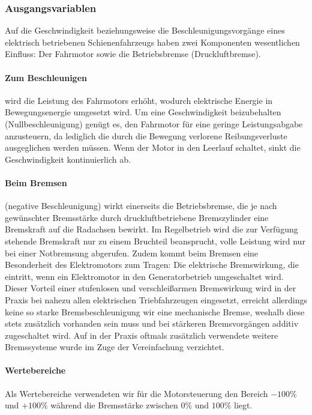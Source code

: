 \documentclass[10pt,a4paper]{article}
\begin{document}
\subsubsection{Ausgangsvariablen}
Auf die Geschwindigkeit beziehungsweise die Beschleunigungsvorgänge eines elektrisch betriebenen Schienenfahrzeugs haben zwei Komponenten wesentlichen Einfluss: Der Fahrmotor sowie die Betriebsbremse (Druckluftbremse).
\paragraph{Zum Beschleunigen} wird die Leistung des Fahrmotors erhöht, wodurch elektrische Energie in Bewegungsenergie umgesetzt wird. Um eine Geschwindigkeit beizubehalten (Nullbeschleunigung) genügt es, den Fahrmotor für eine geringe Leistungsabgabe anzusteuern, da lediglich die durch die Bewegung verlorene Reibungsverluste ausgeglichen werden müssen. Wenn der Motor in den Leerlauf schaltet, sinkt die Geschwindigkeit kontinuierlich ab.

\paragraph{Beim Bremsen} (negative Beschleunigung) wirkt einerseits die Betriebsbremse, die je nach gewünschter Bremsstärke durch druckluftbetriebene Bremszylinder eine Bremskraft auf die Radachsen bewirkt. Im Regelbetrieb wird die zur Verfügung stehende Bremskraft nur zu einem Bruchteil beansprucht, volle Leistung wird nur bei einer Notbremsung abgerufen.
\newline 
\newline
Zudem kommt beim Bremsen eine Besonderheit des Elektromotors zum Tragen: Die elektrische Bremswirkung, die eintritt, wenn ein Elektromotor in den Generatorbetrieb umgeschaltet wird. Dieser Vorteil einer stufenlosen und verschleißarmen Bremswirkung wird in der Praxis bei nahezu allen elektrischen Triebfahrzeugen eingesetzt, erreicht allerdings keine so starke Bremsbeschleunigung wir eine mechanische Bremse, weshalb diese stets zusätzlich vorhanden sein muss und bei stärkeren Bremsvorgängen additiv zugeschaltet wird.
Auf in der Praxis oftmals zusätzlich verwendete weitere Bremssysteme wurde im Zuge der Vereinfachung verzichtet.

\paragraph{Wertebereiche}
Als Wertebereiche verwendeten wir für die Motorsteuerung den Bereich $ -100 \% $ und $ +100 \% $ während die Bremsstärke zwischen $ 0 \% $ und $ 100 \% $ liegt.
\end{document}
